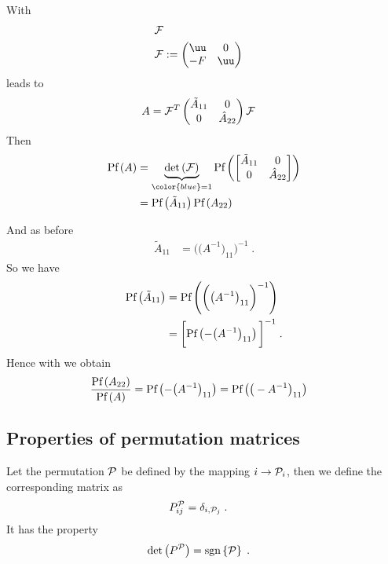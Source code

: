 %
%
With
%
\begin{align}\label{eq:}
{\cal F}\\
{\cal F} &:=\begin{pmatrix}
  \uu& 0  \\
  -F & \uu
\end{pmatrix}  
\end{align}
%
  leads to
%
\begin{align*}
A &= {\cal F}^{T}   
\begin{pmatrix}
  \tilde A_{11}& 0 \\
0  & \hat A_{22}
\end{pmatrix}
{\cal F}
\end{align*}
%
Then  
%
\begin{align*}
\Pf{A} &= \underbrace{
\Det{{\cal F} }
}_{\color{blue} = 1} \Pf{
\begin{bmatrix}
  \tilde A_{11}& 0 \\
0  & \hat A_{22}
\end{bmatrix}
}\\
&= \Pf{\tilde A_{11}}\Pf{A_{22}}
\end{align*}
%

And as before
%
\begin{align*}
\tilde A_{11} &= \bigg(\big(A^{-1}\big)_{11}\bigg)^{-1} \;.
\end{align*}
%
So we have
%
\begin{align*}
\text{Pf}\left(\tilde A_{11}\right) &= \text{Pf}\left(\bigg(\big(A^{-1}\big)_{11}\bigg)^{-1} \right)\\
&= \bigg[ \text{Pf}\left(-\big( A^{-1}\big)_{11} \right)\bigg]^{-1}\;.
\end{align*}
%
Hence with  we obtain
%
\begin{align}\label{eq:Pf:A:hat}
\frac{\text{Pf}\left(A_{22}\right)}{\text{Pf}\left(A\right)} &= \text{Pf}\left(-\big( A^{-1}\big)_{11} \right)
= \text{Pf}\left(\big( - A^{-1}\big)_{11} \right)
\end{align}
%
\subsection{Properties of permutation matrices\label{sec:permutation}}
Let the permutation ${\cal P} $ be defined by the mapping $i\to {\cal P} _{i}$, then we define the 
corresponding matrix as
%
\begin{align}\label{def:permutation:matrix}
P^{{\cal P} }_{i j} &= \delta_{i,{\cal P} _{j}}\;.
\end{align}
%
It has the property
%
\begin{align}\label{eq:}
\text{det}\left(P^{{\cal P} }\right) &= \text{sgn}\left\{{\cal P} \right\}\;.
\end{align}
%

